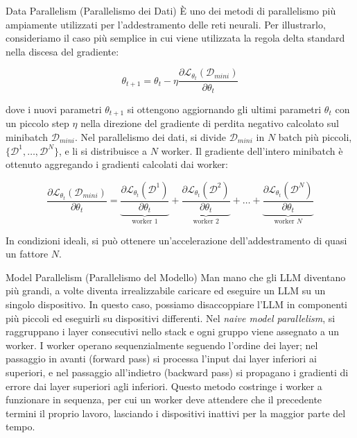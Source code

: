 \begin{definition}{Data Parallelism (Parallelismo dei Dati)}
È uno dei metodi di parallelismo più ampiamente utilizzati per l'addestramento delle reti neurali. Per illustrarlo, consideriamo il caso più semplice in cui viene utilizzata la regola delta standard nella discesa del gradiente:


$$\theta_{t+1} = \theta_t - \eta \frac{\partial \mathcal{L}_{\theta_t}(\mathcal{D}_{mini})}{\partial \theta_t}$$


dove i nuovi parametri $\theta_{t+1}$ si ottengono aggiornando gli ultimi parametri $\theta_t$ con un piccolo step $\eta$ nella direzione del gradiente di perdita negativo calcolato sul minibatch $\mathcal{D}_{mini}$. Nel parallelismo dei dati, si divide $\mathcal{D}_{mini}$ in $N$ batch più piccoli, $\{ \mathcal{D}^1, \dots, \mathcal{D}^N \}$, e li si distribuisce a $N$ worker. Il gradiente dell'intero minibatch è ottenuto aggregando i gradienti calcolati dai worker:


$$\frac{\partial \mathcal{L}_{\theta_t}(\mathcal{D}_{mini})}{\partial \theta_t} = \underbrace{\frac{\partial \mathcal{L}_{\theta_t}(\mathcal{D}^1)}{\partial \theta_t}}_{\text{worker } 1} + \underbrace{\frac{\partial \mathcal{L}_{\theta_t}(\mathcal{D}^2)}{\partial \theta_t}}_{\text{worker } 2} + \dots + \underbrace{\frac{\partial \mathcal{L}_{\theta_t}(\mathcal{D}^N)}{\partial \theta_t}}_{\text{worker } N}$$


In condizioni ideali, si può ottenere un'accelerazione dell'addestramento di quasi un fattore $N$.
\end{definition}

\begin{definition}{Model Parallelism (Parallelismo del Modello)}
Man mano che gli LLM diventano più grandi, a volte diventa irrealizzabile caricare ed eseguire un LLM su un singolo dispositivo. In questo caso, possiamo disaccoppiare l'LLM in componenti più piccoli ed eseguirli su dispositivi differenti. Nel \textit{naive model parallelism}, si raggruppano i layer consecutivi nello stack e ogni gruppo viene assegnato a un worker. I worker operano sequenzialmente seguendo l'ordine dei layer; nel passaggio in avanti (forward pass) si processa l'input dai layer inferiori ai superiori, e nel passaggio all'indietro (backward pass) si propagano i gradienti di errore dai layer superiori agli inferiori. Questo metodo costringe i worker a funzionare in sequenza, per cui un worker deve attendere che il precedente termini il proprio lavoro, lasciando i dispositivi inattivi per la maggior parte del tempo.
\end{definition}

